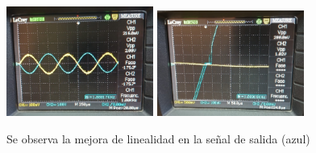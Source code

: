 \documentclass[letterpaper, 10 pt, conference]{ieeeconf}  %
\begin{document}
\begin{figure}[H]
   \centering
   \includegraphics[width=0.43\textwidth]{./linealidad2.jpeg}
   \includegraphics[width=0.43\textwidth]{./linealidad.jpeg}
   \caption{Se observa la mejora de linealidad en la señal de salida (azul)}
   \label{imagen:linealidad}
 \end{figure}


%
\end{document}
